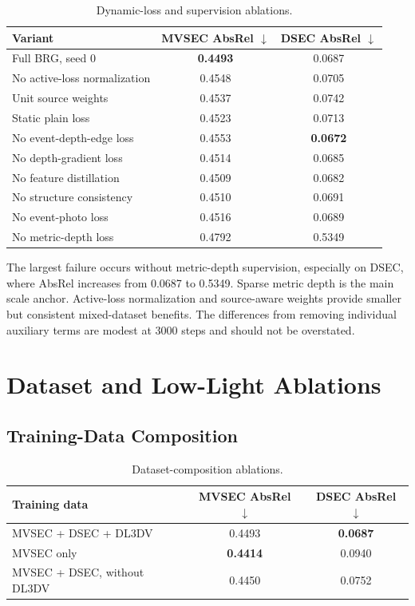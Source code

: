 \documentclass[10pt]{article}
\newcommand{\best}[1]{\textbf{#1}}
\newcommand{\down}{\ensuremath{\downarrow}}
\begin{document}
\begin{table}[h]
\centering
\caption{Dynamic-loss and supervision ablations.}
\label{tab:loss}
\begin{tabular}{lcc}
\toprule
Variant & MVSEC AbsRel \down & DSEC AbsRel \down \\
\midrule
Full BRG, seed 0 & \best{0.4493} & 0.0687 \\
No active-loss normalization & 0.4548 & 0.0705 \\
Unit source weights & 0.4537 & 0.0742 \\
Static plain loss & 0.4523 & 0.0713 \\
No event-depth-edge loss & 0.4553 & \best{0.0672} \\
No depth-gradient loss & 0.4514 & 0.0685 \\
No feature distillation & 0.4509 & 0.0682 \\
No structure consistency & 0.4510 & 0.0691 \\
No event-photo loss & 0.4516 & 0.0689 \\
No metric-depth loss & 0.4792 & 0.5349 \\
\bottomrule
\end{tabular}
\end{table}

The largest failure occurs without metric-depth supervision, especially on
DSEC, where AbsRel increases from 0.0687 to 0.5349.  Sparse metric depth is the
main scale anchor.  Active-loss normalization and source-aware weights provide
smaller but consistent mixed-dataset benefits.  The differences from removing
individual auxiliary terms are modest at 3000 steps and should not be
overstated.

\section{Dataset and Low-Light Ablations}

\subsection{Training-Data Composition}

\begin{table}[h]
\centering
\caption{Dataset-composition ablations.}
\label{tab:data}
\begin{tabular}{lcc}
\toprule
Training data & MVSEC AbsRel \down & DSEC AbsRel \down \\
\midrule
MVSEC + DSEC + DL3DV & 0.4493 & \best{0.0687} \\
MVSEC only & \best{0.4414} & 0.0940 \\
MVSEC + DSEC, without DL3DV & 0.4450 & 0.0752 \\
\bottomrule
\end{tabular}
\end{table}
\end{document}
